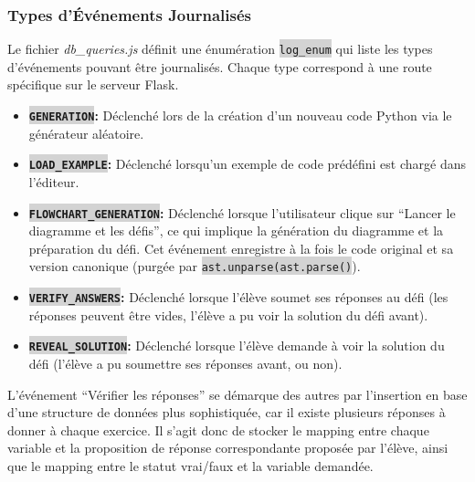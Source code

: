 \documentclass[11pt,a4paper]{article}
\newcommand{\code}[1]{\colorbox{lightgray}{\texttt{\small #1}}}
\newcommand{\filepath}[1]{\textit{#1}}
\begin{document}
\subsubsection{Types d'Événements Journalisés}
Le fichier \filepath{db\_queries.js} définit une énumération \code{log\_enum} qui liste les types d'événements pouvant être journalisés. Chaque type correspond à une route spécifique sur le serveur Flask.

\begin{itemize}
    \item \textbf{\code{GENERATION}:} Déclenché lors de la création d'un nouveau code Python via le générateur aléatoire.
    \item \textbf{\code{LOAD\_EXAMPLE}:} Déclenché lorsqu'un exemple de code prédéfini est chargé dans l'éditeur.
    \item \textbf{\code{FLOWCHART\_GENERATION}:} Déclenché lorsque l'utilisateur clique sur ``Lancer le diagramme et les défis'', ce qui implique la génération du diagramme et la préparation du défi. Cet événement enregistre à la fois le code original et sa version canonique (purgée par \code{ast.unparse(ast.parse()}).
    \item \textbf{\code{VERIFY\_ANSWERS}:} Déclenché lorsque l'élève soumet ses réponses au défi (les réponses peuvent être vides, l'élève a pu voir la solution du défi avant).
    \item \textbf{\code{REVEAL\_SOLUTION}:} Déclenché lorsque l'élève demande à voir la solution du défi (l'élève a pu soumettre ses réponses avant, ou non).
\end{itemize}
L'événement ``Vérifier les réponses'' se démarque des autres par l'insertion en base d'une structure de données plus sophistiquée, car il existe plusieurs réponses à donner à chaque exercice. Il s'agit donc de stocker le mapping entre chaque variable et la proposition de réponse correspondante proposée par l'élève, ainsi que le mapping entre le statut vrai/faux et la variable demandée. 
\end{document}
